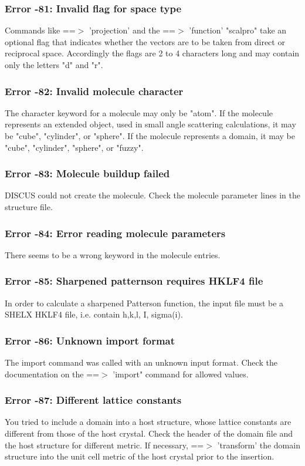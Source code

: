 \subsubsection{Error -81: Invalid flag for space type}
\par
Commands like ==$> $ 'projection' and the ==$> $ 'function' "scalpro" take 
an optional flag that indicates whether the vectors are to be taken 
from direct or reciprocal space. Accordingly the flags are 2 to 4 
characters long and may contain only the letters "d" and "r". 
\subsubsection{Error -82: Invalid molecule character}
\par
The character keyword for a molecule may only be "atom". 
If the molecule represents an extended object, used in small angle 
scattering calculations, it may be "cube", "cylinder", or 
"sphere". 
If the molecule represents a domain, it may be "cube", "cylinder", 
"sphere", or "fuzzy". 
\subsubsection{Error -83: Molecule buildup failed}
\par
DISCUS could not create the molecule. 
Check the molecule parameter lines in the structure file. 
\subsubsection{Error -84: Error reading molecule parameters}
\par
There seems to be a wrong keyword in the molecule entries. 
\subsubsection{Error -85: Sharpened patternson requires HKLF4 file}
\par
In order to calculate a sharpened Patterson function, the input file 
must be a SHELX HKLF4 file, i.e. contain h,k,l, I, sigma(i). 
\subsubsection{Error -86: Unknown import format}
\par
The import command was called with an unknown input format. Check the 
documentation on the ==$> $ 'import" command for allowed values. 
\subsubsection{Error -87: Different lattice constants}
\par
You tried to include a domain into a host structure, whose lattice 
constants are different from those of the host crystal. 
Check the header of the domain file and the host structure for 
different metric. 
If necessary, ==$> $ 'transform' the domain structure into the unit cell 
metric of the host crystal prior to the insertion. 
